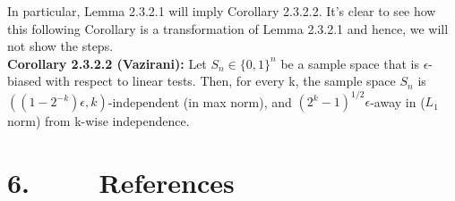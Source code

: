 \documentclass[a4paper, english]{paper}
\begin{document}
 In particular, Lemma 2.3.2.1 will imply Corollary 2.3.2.2. It's clear to see how this following Corollary is a transformation of Lemma 2.3.2.1 and hence, we will not show the steps. \\
	
	\noindent\textbf{Corollary 2.3.2.2 (Vazirani):} Let $S_n \in \{0, 1\}^n$ be a sample space that is $\epsilon$-biased with respect to linear tests. Then, for every k, the sample space $S_n$ is $((1-2^{-k})\epsilon, k)$-independent (in max norm), and $(2^k-1)^{1/2}\epsilon$-away  in ($L_1$ norm) from k-wise independence. \\

	\newpage
	\section{6. $\qquad$ References}
\end{document}
